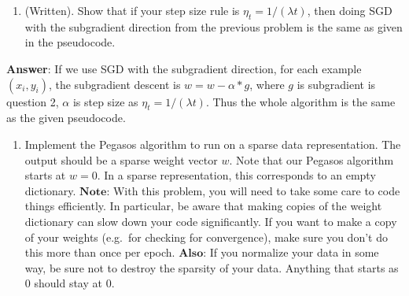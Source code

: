 \documentclass[11pt]{article}
\providecommand{\tightlist}{%
      \setlength{\itemsep}{0pt}\setlength{\parskip}{0pt}}
\begin{document}
    \begin{enumerate}
\def\labelenumi{\arabic{enumi}.}
\setcounter{enumi}{2}
\tightlist
\item
  (Written). Show that if your step size rule is
  \(\eta_{t}=1/\left(\lambda t\right)\), then doing SGD with the
  subgradient direction from the previous problem is the same as given
  in the pseudocode.
\end{enumerate}

    \textbf{Answer}: If we use SGD with the subgradient direction, for each
example \((x_i,y_i)\), the subgradient descent is
\(w = w - \alpha * g\), where \(g\) is subgradient is question 2,
\(\alpha\) is step size as \(\eta_{t}=1/\left(\lambda t\right)\). Thus
the whole algorithm is the same as the given pseudocode.

    \begin{enumerate}
\def\labelenumi{\arabic{enumi}.}
\setcounter{enumi}{3}
\tightlist
\item
  Implement the Pegasos algorithm to run on a sparse data
  representation. The output should be a sparse weight vector \(w\).
  Note that our Pegasos algorithm starts at \(w=0\). In a sparse
  representation, this corresponds to an empty dictionary.
  \(\textbf{Note:}\) With this problem, you will need to take some care
  to code things efficiently. In particular, be aware that making copies
  of the weight dictionary can slow down your code significantly. If you
  want to make a copy of your weights (e.g.~for checking for
  convergence), make sure you don't do this more than once per epoch.
  \(\textbf{Also}\): If you normalize your data in some way, be sure not
  to destroy the sparsity of your data. Anything that starts as \(0\)
  should stay at \(0\).
\end{enumerate}
\end{document}
